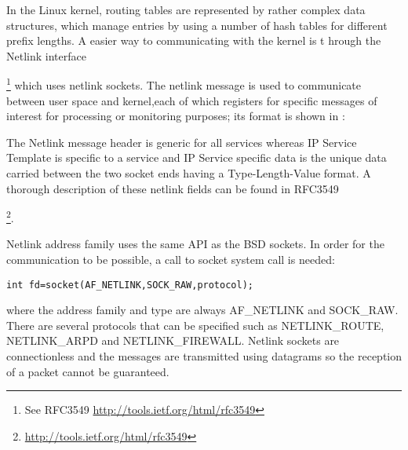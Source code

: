 In the Linux kernel, routing tables are represented by rather complex data structures, which manage entries by 
using a number of hash tables for different prefix lengths. A easier way to communicating with the kernel is t
hrough the Netlink interface{\footnote{See RFC3549 \url{http://tools.ietf.org/html/rfc3549}} which uses netlink sockets.
The netlink message is used to communicate between user space and kernel,each of which registers for specific 
messages of interest for processing or monitoring purposes; its format is shown in :

The Netlink message header is generic for all services whereas IP Service Template is specific to a service and 
IP Service specific data is the unique data carried between the two socket ends having a Type-Length-Value format. 
A thorough description of these netlink fields can be found in RFC3549 {\footnote{\url{http://tools.ietf.org/html/rfc3549}}.

Netlink address family uses the same API as the BSD sockets. In order for the communication to be possible, a call 
to socket system call is needed:
\begin{lstlisting}
int fd=socket(AF_NETLINK,SOCK_RAW,protocol);
\end{lstlisting}
where the address family and type are always AF_NETLINK and SOCK_RAW. There are several protocols that can be specified 
such as NETLINK_ROUTE, NETLINK_ARPD and NETLINK_FIREWALL.
Netlink sockets are connectionless and the messages are transmitted using datagrams so the reception of a packet cannot be guaranteed.

}}
